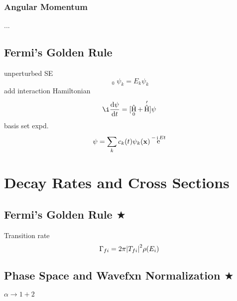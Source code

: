 \documentclass[a4paper]{article}
\DeclareMathOperator{\e}{\mathrm{e}}
\DeclareMathOperator{\I}{\mathrm{i}}
\DeclareMathOperator{\ra}{\rightarrow}
\DeclareMathOperator{\hH}{\hat{H}}
\numberwithin{equation}{section}
\begin{document}
\subsubsection{Angular Momentum}

...

\subsection{Fermi's Golden Rule}
unperturbed SE
\begin{equation}\label{key}
\hH_0\psi_k = E_k\psi_k
\end{equation}
add interaction Hamiltonian
\begin{equation}\label{key}
\i\dv{\psi}{t} = [\hH_0 + \hH']\psi
\end{equation}
basis set expd.
\begin{equation}\label{key}
\psi = \sum_k c_k(t)\psi_k(\vb{x})\e^{-\I Et}
\end{equation}

\section{Decay Rates and Cross Sections}

\subsection{Fermi's Golden Rule $ \bigstar $}
Transition rate
\begin{equation}\label{key}
\Gamma_{fi} = 2\pi \abs{T_{fi}}^2\rho(E_i)
\end{equation}

\subsection{Phase Space and Wavefxn Normalization $ \bigstar $}
$ \alpha \ra 1 + 2 $ \\
\end{document}
